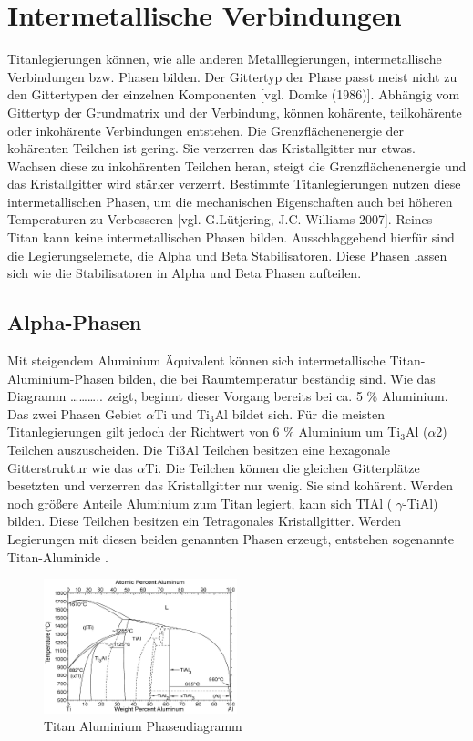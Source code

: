 \documentclass[a4paper, 11pt]{tubsreprt}
\begin{document}
\section{Intermetallische Verbindungen}
Titanlegierungen können, wie alle anderen Metalllegierungen, intermetallische Verbindungen bzw. Phasen bilden. Der Gittertyp der Phase passt meist nicht zu den Gittertypen der einzelnen Komponenten [vgl. Domke (1986)]. Abhängig vom Gittertyp der Grundmatrix und der Verbindung,  können kohärente, teilkohärente oder inkohärente Verbindungen entstehen. Die Grenzflächenenergie der kohärenten Teilchen ist gering. Sie verzerren das Kristallgitter nur etwas. Wachsen diese zu inkohärenten Teilchen heran, steigt die Grenzflächenenergie und das Kristallgitter wird stärker verzerrt.
Bestimmte Titanlegierungen nutzen diese intermetallischen Phasen, um die mechanischen Eigenschaften auch bei höheren Temperaturen zu Verbesseren [vgl. G.Lütjering, J.C. Williams 2007].   
Reines Titan kann keine intermetallischen Phasen bilden. Ausschlaggebend hierfür sind die Legierungselemete, die Alpha und Beta Stabilisatoren.  Diese Phasen lassen sich wie die Stabilisatoren  in Alpha und Beta Phasen aufteilen.  

\subsection{Alpha-Phasen}
Mit steigendem Aluminium Äquivalent können sich intermetallische Titan-Aluminium-Phasen bilden, die bei Raumtemperatur beständig sind. Wie das Diagramm ……….. zeigt, beginnt dieser Vorgang bereits bei ca. 5 \% Aluminium. Das zwei Phasen Gebiet $\alpha$Ti und Ti$_{3}$Al bildet sich. Für die meisten Titanlegierungen gilt jedoch der Richtwert von 6 \% Aluminium um Ti$_{3}$Al ($\alpha$2) Teilchen auszuscheiden.  Die Ti3Al Teilchen besitzen eine hexagonale Gitterstruktur wie das $\alpha$Ti. Die Teilchen können  die gleichen Gitterplätze besetzten und verzerren das Kristallgitter nur wenig. Sie sind kohärent.
Werden noch größere Anteile Aluminium  zum Titan legiert, kann sich TIAl ( $\gamma$-TiAl) bilden. Diese Teilchen besitzen ein Tetragonales Kristallgitter.
 Werden Legierungen mit diesen beiden genannten Phasen erzeugt, entstehen sogenannte Titan-Aluminide \cite{Luetjering2007}.   
\begin{figure}
\centering
\includegraphics[width=0.5\textwidth]{Bilder/Titanaluminide.png}
\caption{Titan Aluminium Phasendiagramm}
\end{figure}
 
\end{document}
